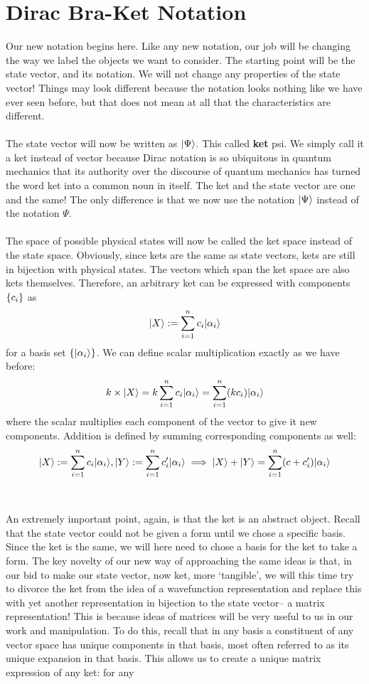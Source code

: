 \section{Dirac Bra-Ket Notation}
Our new notation begins here. Like any new notation, our job will be changing the way we label the objects we want to consider. The starting point will be the state vector, and its notation. We will not change any properties of the state vector! Things may look different because the notation looks nothing like we have ever seen before, but that does not mean at all that the characteristics are different.
\\\\
The state vector will now be written as $|\Psi\rangle$. This called \textbf{ket} psi. We simply call it a ket instead of vector because Dirac notation is so ubiquitous in quantum mechanics that its authority over the discourse of quantum mechanics has turned the word ket into a  common noun in itself. The ket and the state vector are one and the same! The only difference is that we now use the notation $|\Psi\rangle$ instead of the notation $\Psi$. 
\\\\
The space of possible physical states will now be called the ket space instead of the state space. Obviously, since kets are the same as state vectors, kets are still in bijection with physical states. The vectors which span the ket space are also kets themselves. Therefore, an arbitrary ket can be expressed with components $\{c_{i}\}$ as $$|X\rangle:=\sum_{i=1}^{n}c_{i}|\alpha_{i}\rangle$$ for a basis set $\{|\alpha_{i}\rangle\}$. We can define scalar multiplication exactly as we have before:
$$
k\times|X\rangle=k\sum_{i=1}^{n}c_{i}|\alpha_{i}\rangle=\sum_{i=1}^{n}(kc_{i})|\alpha_{i}\rangle
$$
where the scalar multiplies each component of the vector to give it new components. Addition is defined by summing corresponding components as well:
$$
|X\rangle:=\sum_{i=1}^{n}c_{i}|\alpha_{i}\rangle, |Y\rangle:=\sum_{i=1}^{n}c'_{i}|\alpha_{i}\rangle\implies |X\rangle+|Y\rangle=\sum_{i=1}^{n}(c+c'_{i})|\alpha_{i}\rangle
$$
\\\\
An extremely important point, again, is that the ket is an abstract object. Recall that the state vector could not be given a form until we chose a specific basis. Since the ket is the same, we will here need to chose a basis for the ket to take a form. The key novelty of our new way of approaching the same ideas is that, in our bid to make our state vector, now ket, more `tangible', we will this time try to divorce the ket from the idea of a wavefunction representation and replace this with yet another representation in bijection to the state vector-- a matrix representation! This is because ideas of matrices will be very useful to us in our work and manipulation. To do this, recall that in any basis a constituent of any vector space has unique components in that basis, most often referred to as its unique expansion in that basis. This allows us to create a unique matrix expression of any ket: for any
